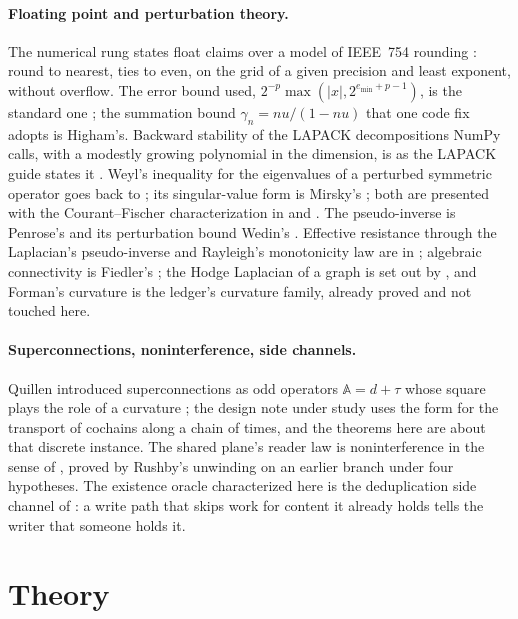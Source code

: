 \documentclass[11pt]{article}
\theoremstyle{plain}
\theoremstyle{definition}
\theoremstyle{remark}
\newcommand{\abs}[1]{\lvert #1 \rvert}
\newcommand{\A}{\mathbb{A}}
\begin{document}
\paragraph{Floating point and perturbation theory.} The numerical rung states float claims over
a model of IEEE~754 rounding \citep{ieee754}: round to nearest, ties to even, on the grid of a
given precision and least exponent, without overflow. The error bound used,
$2^{-p}\max(\abs{x}, 2^{e_{\min}+p-1})$, is the standard one \citep{goldberg1991,higham2002}; the
summation bound $\gamma_n = nu/(1 - nu)$ that one code fix adopts is Higham's. Backward stability
of the LAPACK decompositions NumPy calls, with a modestly growing polynomial in the dimension, is
as the LAPACK guide states it \citep{lapack1999}. Weyl's inequality for the eigenvalues of a
perturbed symmetric operator goes back to \citet{weyl1912}; its singular-value form is Mirsky's
\citep{mirsky1960}; both are presented with the Courant--Fischer characterization in
\citet{hornjohnson2013} and \citet{stewartsun1990}. The pseudo-inverse is Penrose's
\citep{penrose1955} and its perturbation bound Wedin's \citep{wedin1973}. Effective resistance
through the Laplacian's pseudo-inverse and Rayleigh's monotonicity law are in
\citet{doylesnell1984}; algebraic connectivity is Fiedler's \citep{fiedler1973}; the Hodge
Laplacian of a graph is set out by \citet{lim2020}, and Forman's curvature \citep{forman2003} is
the ledger's curvature family, already proved and not touched here.

\paragraph{Superconnections, noninterference, side channels.} Quillen introduced
superconnections as odd operators $\A = d + \tau$ whose square plays the role of a curvature
\citep{quillen1985}; the design note under study uses the form for the transport of cochains
along a chain of times, and the theorems here are about that discrete instance. The shared plane's
reader law is noninterference in the sense of \citet{goguenmeseguer1982}, proved by Rushby's
unwinding \citep{rushby1992} on an earlier branch under four hypotheses. The existence oracle
characterized here is the deduplication side channel of \citet{harnik2010}: a write path that
skips work for content it already holds tells the writer that someone holds it.

\section{Theory}
\end{document}
